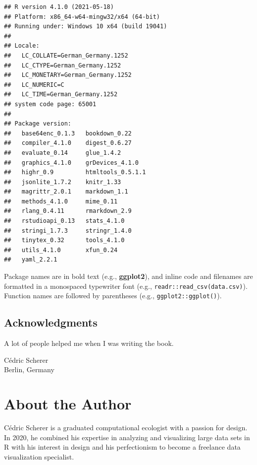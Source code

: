 \documentclass[
]{krantz}
\begin{document}
\begin{verbatim}
## R version 4.1.0 (2021-05-18)
## Platform: x86_64-w64-mingw32/x64 (64-bit)
## Running under: Windows 10 x64 (build 19041)
## 
## Locale:
##   LC_COLLATE=German_Germany.1252 
##   LC_CTYPE=German_Germany.1252   
##   LC_MONETARY=German_Germany.1252
##   LC_NUMERIC=C                   
##   LC_TIME=German_Germany.1252    
## system code page: 65001
## 
## Package version:
##   base64enc_0.1.3   bookdown_0.22    
##   compiler_4.1.0    digest_0.6.27    
##   evaluate_0.14     glue_1.4.2       
##   graphics_4.1.0    grDevices_4.1.0  
##   highr_0.9         htmltools_0.5.1.1
##   jsonlite_1.7.2    knitr_1.33       
##   magrittr_2.0.1    markdown_1.1     
##   methods_4.1.0     mime_0.11        
##   rlang_0.4.11      rmarkdown_2.9    
##   rstudioapi_0.13   stats_4.1.0      
##   stringi_1.7.3     stringr_1.4.0    
##   tinytex_0.32      tools_4.1.0      
##   utils_4.1.0       xfun_0.24        
##   yaml_2.2.1
\end{verbatim}

Package names are in bold text (e.g., \textbf{ggplot2}), and inline code and filenames are formatted in a monospaced typewriter font (e.g., \texttt{readr::read\_csv(\textquotesingle{}data.csv\textquotesingle{})}). Function names are followed by parentheses (e.g., \texttt{ggplot2::ggplot()}).

\hypertarget{acknowledgments}{%
\section*{Acknowledgments}\label{acknowledgments}}


A lot of people helped me when I was writing the book.

\begin{flushright}
Cédric Scherer\\
Berlin, Germany
\end{flushright}

\hypertarget{about-the-author}{%
\chapter*{About the Author}\label{about-the-author}}


Cédric Scherer is a graduated computational ecologist with a passion for design. In 2020, he combined his expertise in analyzing and visualizing large data sets in R with his interest in design and his perfectionism to become a freelance data visualization specialist.
\end{document}
